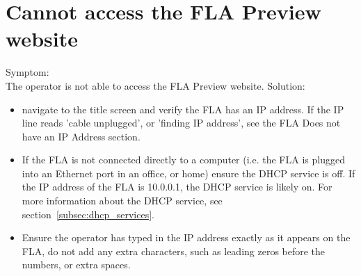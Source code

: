 \documentclass[11pt, oneside]{book}
\begin{document}
\section{Cannot access the FLA Preview website}
Symptom:\\
The operator is not able to access the FLA Preview website.
Solution:\\
\begin{itemize}
\item navigate to the title screen and verify the FLA has an IP address. If the IP line reads 'cable unplugged', or 'finding IP address', see the FLA Does not have an IP Address section.
\item If the FLA is not connected directly to a computer (i.e. the FLA is plugged into an Ethernet port in an office, or home) ensure the DHCP service is off. If the IP address of the FLA is 10.0.0.1, the DHCP service is likely on. For more information about the DHCP service, see section~\ref{subsec:dhcp_services}.
\item Ensure the operator has typed in the IP address exactly as it appears on the FLA, do not add any extra characters, such as leading zeros before the numbers, or extra spaces.
\end{itemize}
\end{document}
